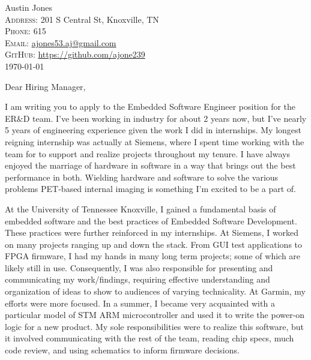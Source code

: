 \documentclass[a4paper,12pt]{article}
\begin{document}
\pagestyle{empty} %


\Huge Austin Jones\smallskip{} \\
\small \textsc{Address:} 201 S Central St, Knoxville, TN \\
\small \textsc{Phone:} 615 \\
\textsc{Email:} \href{mailto:ajones53.aj@gmail.com}{ajones53.aj@gmail.com} \\
\textsc{GitHub:} \href{https://github.com/ajone239}{https://github.com/ajone239} \\

\today

Dear Hiring Manager,

I am writing you to apply to the Embedded Software Engineer position for the ER\&D team.
I've been working in industry for about 2 years now, but I've nearly 5 years of engineering experience given the work I did in internships.
My longest reigning internship was actually at Siemens, where I spent time working with the team for to support and realize projects throughout my tenure.
I have always enjoyed the marriage of hardware in software in a way that brings out the best performance in both.
Wielding hardware and software to solve the various problems PET-based internal imaging is something I'm excited to be a part of.


At the University of Tennessee Knoxville, I gained a fundamental basis of embedded software and the best practices of Embedded Software Development.
These practices were further reinforced in my internships.
At Siemens, I worked on many projects ranging up and down the stack.
From GUI test applications to FPGA firmware, I had my hands in many long term projects; some of which are likely still in use.
Consequently, I was also responsible for presenting and communicating my work/findings, requiring effective understanding and organization of ideas to show to audiences of varying technicality.
At Garmin, my efforts were more focused.
In a summer, I became very acquainted with a particular model of STM ARM microcontroller and used it to write the power-on logic for a new product.
My sole responsibilities were to realize this software, but it involved communicating with the rest of the team, reading chip specs, much code review, and using schematics to inform firmware decisions.
\end{document}
